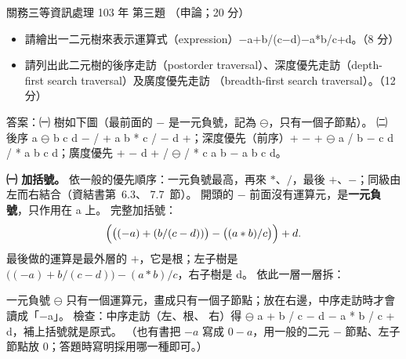 \begin{pastexam}[label={px:gw3-103-ds-03}]{關務三等資訊處理 103 年 第三題}
（申論；20 分）

\begin{itemize}[leftmargin=2.2em]
\item[㈠] 請繪出一二元樹來表示運算式（expression）$-$a+b/(c$-$d)$-$a*b/c+d。（8 分）
\item[㈡] 請列出此二元樹的後序走訪（postorder traversal）、深度優先走訪（depth-first search traversal）及廣度優先走訪
（breadth-first search traversal）。（12 分）
\end{itemize}
\end{pastexam}

\begin{pastsoln}
答案：㈠ 樹如下圖（最前面的 $-$ 是一元負號，記為 $\ominus$，只有一個子節點）。 ㈡ 後序
a $\ominus$ b c d $-$ / + a b * c / $-$ d +；深度優先（前序）+ $-$ + $\ominus$ a / b $-$ c d / * a b c d；廣度優先
+ $-$ d + / $\ominus$ / * c a b $-$ a b c d。

\textbf{㈠ 加括號。} 依一般的優先順序：一元負號最高，再來 $*$、$/$，最後 $+$、$-$；同級由左而右結合（資結書第~6.3、
7.7~節）。 開頭的 $-$ 前面沒有運算元，是\textbf{一元負號}，只作用在 a 上。 完整加括號：
\[
\Bigl(\bigl((-a) + (b / (c - d))\bigr) - \bigl((a * b) / c\bigr)\Bigr) + d .
\]
最後做的運算是最外層的 $+$，它是根；左子樹是 $\bigl((-a) + b/(c-d)\bigr) - (a*b)/c$，右子樹是 d。 依此一層一層拆：
\begin{center}
\end{center}
一元負號 $\ominus$ 只有一個運算元，畫成只有一個子節點；放在右邊，中序走訪時才會讀成「$-$a」。 檢查：中序走訪（左、根、
右）得 $\ominus$ a + b / c $-$ d $-$ a * b / c + d，補上括號就是原式。 （也有書把 $-a$ 寫成 $0 - a$，用一般的二元
$-$ 節點、左子節點放 $0$；答題時寫明採用哪一種即可。）


\end{pastsoln}
